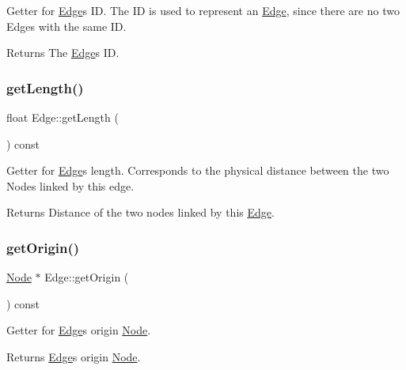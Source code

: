 Getter for \hyperlink{class_edge}{Edge}\textquotesingle{}s ID. The ID is used to represent an \hyperlink{class_edge}{Edge}, since there are no two Edges with the same ID.

\begin{DoxyReturn}{Returns}
The \hyperlink{class_edge}{Edge}\textquotesingle{}s ID. 
\end{DoxyReturn}
\hypertarget{class_edge_ae96241bc7956c47dba61f7a0cfec01c3}{}\label{class_edge_ae96241bc7956c47dba61f7a0cfec01c3} 
\subsubsection{\texorpdfstring{get\+Length()}{getLength()}}
{\footnotesize\ttfamily float Edge\+::get\+Length (\begin{DoxyParamCaption}{ }\end{DoxyParamCaption}) const}

Getter for \hyperlink{class_edge}{Edge}\textquotesingle{}s length. Corresponds to the physical distance between the two Nodes linked by this edge.

\begin{DoxyReturn}{Returns}
Distance of the two nodes linked by this \hyperlink{class_edge}{Edge}. 
\end{DoxyReturn}
\hypertarget{class_edge_a04719c702ae24dcfbce3874a573ca360}{}\label{class_edge_a04719c702ae24dcfbce3874a573ca360} 
\subsubsection{\texorpdfstring{get\+Origin()}{getOrigin()}}
{\footnotesize\ttfamily \hyperlink{class_node}{Node} $\ast$ Edge\+::get\+Origin (\begin{DoxyParamCaption}{ }\end{DoxyParamCaption}) const}

Getter for \hyperlink{class_edge}{Edge}\textquotesingle{}s origin \hyperlink{class_node}{Node}.

\begin{DoxyReturn}{Returns}
\hyperlink{class_edge}{Edge}\textquotesingle{}s origin \hyperlink{class_node}{Node}. 
\end{DoxyReturn}
\hypertarget{class_edge_ae967ccaa1db4dba903ccfb3c55be9bc5}{}\label{class_edge_ae967ccaa1db4dba903ccfb3c55be9bc5} 
